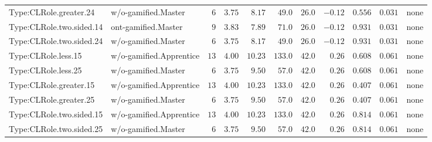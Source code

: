 \documentclass[6pt,a4paper]{article}
\begin{document}
{\begin{longtable}{llrrrrrrrrl}
Type:CLRole.greater.24&w/o-gamified.Master&$ 6$&$3.75$&$ 8.17$&$ 49.0$&$ 26.0$&$-0.12$&$0.556$&$0.031$&none\tabularnewline
Type:CLRole.two.sided.14&ont-gamified.Master&$ 9$&$3.83$&$ 7.89$&$ 71.0$&$ 26.0$&$-0.12$&$0.931$&$0.031$&none\tabularnewline
Type:CLRole.two.sided.24&w/o-gamified.Master&$ 6$&$3.75$&$ 8.17$&$ 49.0$&$ 26.0$&$-0.12$&$0.931$&$0.031$&none\tabularnewline
Type:CLRole.less.15&w/o-gamified.Apprentice&$13$&$4.00$&$10.23$&$133.0$&$ 42.0$&$ 0.26$&$0.608$&$0.061$&none\tabularnewline
Type:CLRole.less.25&w/o-gamified.Master&$ 6$&$3.75$&$ 9.50$&$ 57.0$&$ 42.0$&$ 0.26$&$0.608$&$0.061$&none\tabularnewline
Type:CLRole.greater.15&w/o-gamified.Apprentice&$13$&$4.00$&$10.23$&$133.0$&$ 42.0$&$ 0.26$&$0.407$&$0.061$&none\tabularnewline
Type:CLRole.greater.25&w/o-gamified.Master&$ 6$&$3.75$&$ 9.50$&$ 57.0$&$ 42.0$&$ 0.26$&$0.407$&$0.061$&none\tabularnewline
\newpage
Type:CLRole.two.sided.15&w/o-gamified.Apprentice&$13$&$4.00$&$10.23$&$133.0$&$ 42.0$&$ 0.26$&$0.814$&$0.061$&none\tabularnewline
Type:CLRole.two.sided.25&w/o-gamified.Master&$ 6$&$3.75$&$ 9.50$&$ 57.0$&$ 42.0$&$ 0.26$&$0.814$&$0.061$&none\tabularnewline
\hline
\end{longtable}}
\end{document}
